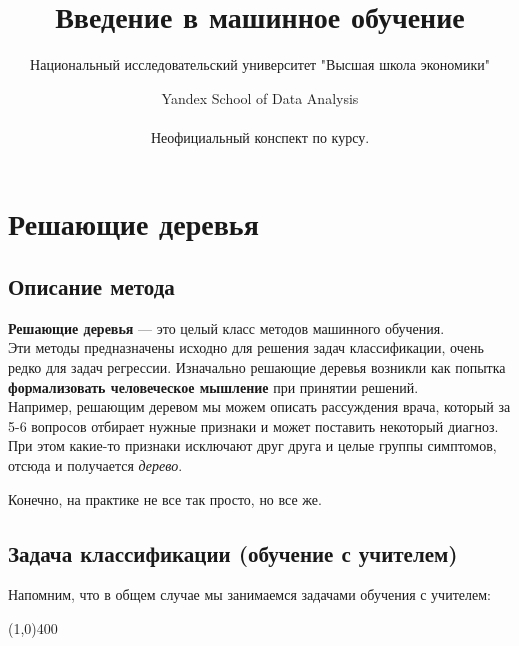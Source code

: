 \documentclass{article}
\title{Введение в машинное обучение}
\author{Национальный исследовательский университет "Высшая школа экономики" \and Yandex School of Data Analysis\\\\
Неофициальный конспект по курсу.}
\begin{document}
\maketitle

\section{Решающие деревья}

\subsection{Описание метода}
\textbf{Решающие деревья} --- это целый класс методов машинного обучения.
\\

Эти методы предназначены исходно для решения задач классификации, очень редко для задач регрессии. Изначально решающие деревья возникли как попытка \textbf{формализовать человеческое мышление} при принятии решений.
\\

Например, решающим деревом мы можем описать рассуждения врача, который за 5-6 вопросов отбирает нужные признаки и может поставить некоторый диагноз. При этом какие-то признаки исключают друг друга и целые группы симптомов, отсюда и получается \textit{дерево}.

Конечно, на практике не все так просто, но все же.

\subsection{Задача классификации (обучение с учителем)}

Напомним, что в общем случае мы занимаемся задачами обучения с учителем:

\begin{center}
\line(1,0){400}
\end{center}
\end{document}
